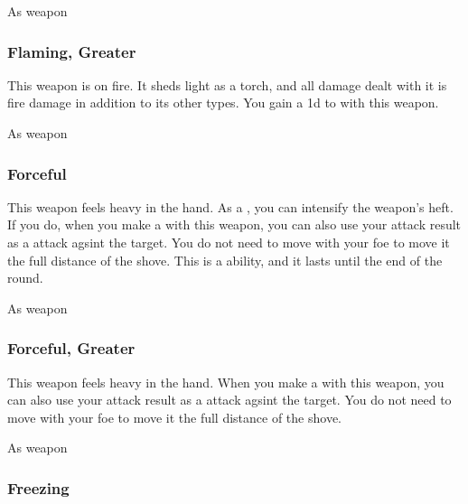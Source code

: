 As weapon


\lowercase{\hypertarget{item:Flaming, Greater}{}}\label{item:Flaming, Greater}
\hypertarget{item:Flaming, Greater}{\subsubsection{Flaming, Greater\hfill{}}}

This weapon is on fire.
It sheds light as a torch, and all damage dealt with it is fire damage in addition to its other types.
You gain a \plus1d  to  with this weapon.



 


 As weapon


\lowercase{\hypertarget{item:Forceful}{}}\label{item:Forceful}
\hypertarget{item:Forceful}{\subsubsection{Forceful\hfill{}}}

This weapon feels heavy in the hand.
As a , you can intensify the weapon's heft.
If you do, when you make a  with this weapon, you can also use your attack result as a  attack agsint the target.
You do not need to move with your foe to move it the full distance of the shove.
This is a  ability, and it lasts until the end of the round.



 As weapon


\lowercase{\hypertarget{item:Forceful, Greater}{}}\label{item:Forceful, Greater}
\hypertarget{item:Forceful, Greater}{\subsubsection{Forceful, Greater\hfill{}}}

This weapon feels heavy in the hand.
When you make a  with this weapon, you can also use your attack result as a  attack agsint the target.
You do not need to move with your foe to move it the full distance of the shove.



 As weapon


\lowercase{\hypertarget{item:Freezing}{}}\label{item:Freezing}
\hypertarget{item:Freezing}{\subsubsection{Freezing\hfill{}}}

